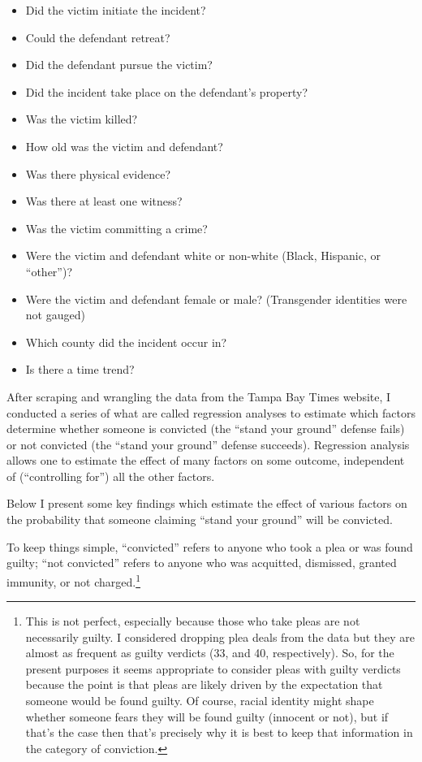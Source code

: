 \documentclass[12pt,article]{article}
\begin{document}
\begin{itemize}
\itemsep1pt\parskip0pt
\item
  Did the victim initiate the incident?
\item
  Could the defendant retreat?
\item
  Did the defendant pursue the victim?
\item
  Did the incident take place on the defendant's property?
\item
  Was the victim killed?
\item
  How old was the victim and defendant?
\item
  Was there physical evidence?
\item
  Was there at least one witness?
\item
  Was the victim committing a crime?
\item
  Were the victim and defendant white or non-white (Black, Hispanic, or
  ``other'')?
\item
  Were the victim and defendant female or male? (Transgender identities
  were not gauged)
\item
  Which county did the incident occur in?
\item
  Is there a time trend?
\end{itemize}

After scraping and wrangling the data from the Tampa Bay Times website,
I conducted a series of what are called regression analyses to estimate
which factors determine whether someone is convicted (the ``stand your
ground'' defense fails) or not convicted (the ``stand your ground''
defense succeeds). Regression analysis allows one to estimate the effect
of many factors on some outcome, independent of (``controlling for'')
all the other factors.

Below I present some key findings which estimate the effect of various
factors on the probability that someone claiming ``stand your ground''
will be convicted.

To keep things simple, ``convicted'' refers to anyone who took a plea or
was found guilty; ``not convicted'' refers to anyone who was acquitted,
dismissed, granted immunity, or not
charged.\footnote{This is not perfect, especially because those who take pleas are not necessarily guilty. I considered dropping plea deals from the data but they are almost as frequent as guilty verdicts (33, and 40, respectively). So, for the present purposes it seems appropriate to consider pleas with guilty verdicts because the point is that pleas are likely driven by the expectation that someone would be found guilty. Of course, racial identity might shape whether someone fears they will be found guilty (innocent or not), but if that's the case then that's precisely why it is best to keep that information in the category of conviction.}
\end{document}
